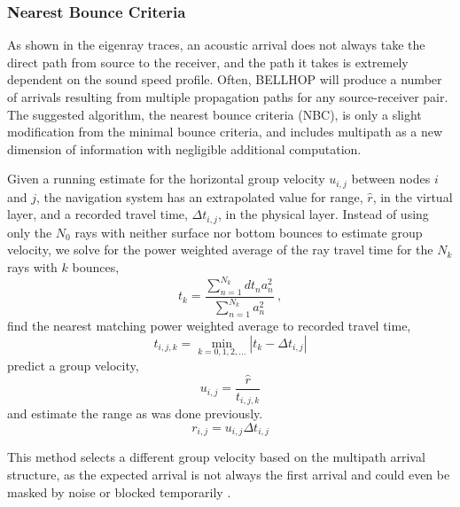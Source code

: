 \subsubsection{Nearest Bounce Criteria}

As shown in the eigenray traces, an acoustic arrival does not always take the direct path from source to the receiver, and the path it takes is extremely dependent on the sound speed profile.
Often, BELLHOP will produce a number of arrivals resulting from multiple propagation paths for any source-receiver pair.
The suggested algorithm, the nearest bounce criteria (NBC), is only a slight modification from the minimal bounce criteria, and includes multipath as a new dimension of information with negligible additional computation.

Given a running estimate for the horizontal group velocity $u_{i,j}$ between nodes $i$ and $j$, the navigation system has an extrapolated value for range, $\hat{r}$, in the virtual layer, and a recorded travel time, $\Delta t_{i,j}$, in the physical layer.
Instead of using only the $N_0$ rays with neither surface nor bottom bounces to estimate group velocity, we solve for the power weighted average of the ray travel time for the $N_k$ rays with $k$ bounces,
\begin{equation}
t_k = \frac{\sum_{n=1}^{N_{k}} dt_{n}a_{n}^{2}}{\sum_{n=1}^{N_{k}} a_{n}^{2}} ~, 
\end{equation}
find the nearest matching power weighted average to recorded travel time,
\begin{equation}
t_{i,j,k} = \min_{k=0,1,2,...} \left| t_k - \Delta t_{i,j} \right|
\end{equation}
predict a group velocity,
\begin{equation}
u_{i,j} = \dfrac{\hat{r}}{t_{i,j,k}}
\end{equation}
and estimate the range as was done previously.
\begin{equation}
r_{i,j} = u_{i,j}\Delta t_{i,j}
\end{equation}

This method selects a different group velocity based on the multipath arrival structure, as the expected arrival is not always the first arrival and could even be masked by noise or blocked temporarily \citep{deffenbaugh_acoustic_1996}.


